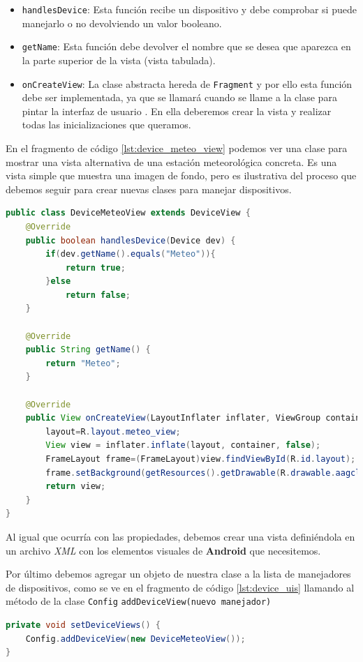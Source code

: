 \begin{itemize}
  \item \texttt{handlesDevice}:
  Esta función recibe un dispositivo y debe comprobar si puede manejarlo o no devolviendo un valor booleano.

  \item \texttt{getName}:
  Esta función debe devolver el nombre que se desea que aparezca en la parte superior de la vista (vista tabulada).

  \item \texttt{onCreateView}:
  La clase abstracta hereda de \texttt{Fragment} y por ello esta función debe ser implementada, ya que se llamará cuando se llame a la clase para pintar la interfaz de usuario \cite{ALCA}. En ella deberemos crear la vista y realizar todas las inicializaciones que queramos.

\end{itemize}

\bigskip
En el fragmento de código \ref{lst:device_meteo_view} podemos ver una clase para mostrar una vista alternativa de una estación meteorológica concreta. Es una vista simple que muestra una imagen de fondo, pero es ilustrativa del proceso que debemos seguir para crear nuevas clases para manejar dispositivos.

\begin{lstlisting}[language=Java,caption={Clase DeviceMeteoView},label={lst:device_meteo_view}]
public class DeviceMeteoView extends DeviceView {
    @Override
    public boolean handlesDevice(Device dev) {
        if(dev.getName().equals("Meteo")){
            return true;
        }else
            return false;
    }

    @Override
    public String getName() {
        return "Meteo";
    }

    @Override
    public View onCreateView(LayoutInflater inflater, ViewGroup container, Bundle savedInstanceState) {
        layout=R.layout.meteo_view;
        View view = inflater.inflate(layout, container, false);
        FrameLayout frame=(FrameLayout)view.findViewById(R.id.layout);
        frame.setBackground(getResources().getDrawable(R.drawable.aagcloudwatcher));
        return view;
    }
}

\end{lstlisting}

\bigskip
Al igual que ocurría con las propiedades, debemos crear una vista definiéndola en un archivo \textit{XML} con los elementos visuales de \textbf{Android} que necesitemos.

\bigskip
Por último debemos agregar un objeto de nuestra clase a la lista de manejadores de dispositivos, como se ve en el fragmento de código \ref{lst:device_uis} llamando al método de la clase \texttt{Config} \texttt{addDeviceView(nuevo manejador)}

\begin{lstlisting}[language=Java,caption={Lista de objetos manejadores de dispositivos},label={lst:device_uis}]
private void setDeviceViews() {
    Config.addDeviceView(new DeviceMeteoView());
}

\end{lstlisting}